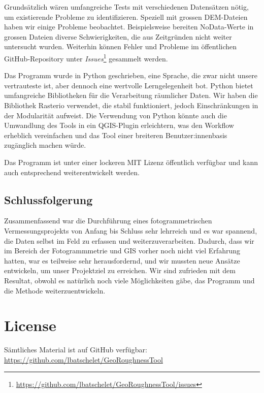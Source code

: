 \documentclass[12pt]{article}
\newcommand{\github}[1]{%
    \href{#1}{\faGithubSquare}%
}
\begin{document}
        Grundsätzlich wären umfangreiche Tests mit verschiedenen Datensätzen nötig, um existierende Probleme zu identifizieren. 
        Speziell mit grossen DEM-Dateien haben wir einige Probleme beobachtet. 
        Beispielsweise bereiten NoData-Werte in grossen Dateien diverse Schwierigkeiten, die aus Zeitgründen nicht weiter untersucht wurden.
        Weiterhin können Fehler und Probleme im öffentlichen GitHub-Repository unter \textit{Issues}\footnote{\href{https://github.com/lbatschelet/GeoRoughness-Tool/issues}{https://github.com/lbatschelet/GeoRoughness\-Tool/issues}} gesammelt werden.

        Das Programm wurde in Python geschrieben, eine Sprache, die zwar nicht unsere vertrauteste ist, aber dennoch eine wertvolle Lerngelegenheit bot.
        Python bietet umfangreiche Bibliotheken für die Verarbeitung räumlicher Daten.
        Wir haben die Bibliothek Rasterio verwendet, die stabil funktioniert, jedoch Einschränkungen in der Modularität aufweist.
        Die Verwendung von Python könnte auch die Umwandlung des Tools in ein QGIS-Plugin erleichtern, was den Workflow erheblich vereinfachen und das Tool einer breiteren Benutzer:innenbasis zugänglich machen würde.

        Das Programm ist unter einer lockeren MIT Lizenz öffentlich verfügbar und kann auch entsprechend weiterentwickelt werden.

    \subsection{Schlussfolgerung}\label{subsec:schlussfolgerung}

        Zusammenfassend war die Durchführung eines fotogrammetrischen Vermessungsprojekts von Anfang bis Schluss sehr lehrreich und es war spannend, die Daten selbst im Feld zu erfassen und weiterzuverarbeiten.
        Dadurch, dass wir im Bereich der Fotogrammmetrie und GIS vorher noch nicht viel Erfahrung hatten, war es teilweise sehr herausfordernd, und wir mussten neue Ansätze entwickeln, um unser Projektziel zu erreichen.
        Wir sind zufrieden mit dem Resultat, obwohl es natürlich noch viele Möglichkeiten gäbe, das Programm und die Methode weiterzuentwickeln.




\printbibliography


\section*{License}
    \doclicenseThis
    \github{https://github.com/lbatschelet/GeoRoughness-Tool} Sämtliches Material ist auf GitHub verfügbar:
    \\ \href{https://github.com/lbatschelet/GeoRoughness-Tool}{https://github.com/lbatschelet/GeoRoughness\-Tool}
\end{document}

